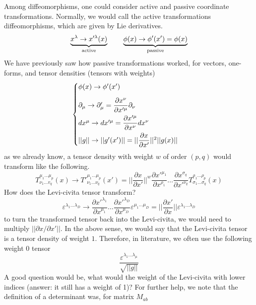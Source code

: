 \begin{recall}
Among diffeomorphisms, one could consider active and passive coordinate transformations. Normally, we would call the active transformations diffeomorphisms, which are given by Lie derivatives. 
\[\underbrace{x^{\lambda }\rightarrow x'^{\lambda }(x)}_{\mathrm{active}}\hspace{5ex}\underbrace{\phi(x)\rightarrow \phi '(x')=\phi (x) }_{\mathrm{passive}}\]
We have previously saw how passive transformations worked, for vectors, one-forms, and tensor densities (tensors with weights)
\[\begin{cases}
\vspace{2ex}\phi (x)\rightarrow \phi '(x')\\\vspace{1ex}
\partial _{\mu }\rightarrow \partial _{\mu }'=\dfrac{\partial x^{\nu }}{\partial x'^{\mu }}\partial _{\nu }\\\vspace{1ex}
dx^{\mu }\rightarrow dx'^{\mu }=\dfrac{\partial x'^{\mu }}{\partial x^{\nu }}dx^{\nu } \\||g||\rightarrow ||g'(x')||=||\dfrac{\partial x}{\partial x'}||^2||g(x)|| 
\end{cases}\]
as we already know, a tensor density with weight $w$ of order $(p,q)$ would transform like the following.
\[T^{\mu_1 \ldots \mu _{p} }_{\nu_1\ldots v_{q}}(x)\rightarrow T'^{\mu _1\ldots \mu _{p}}_{\nu _1\ldots \nu _{q}}(x')=||\dfrac{\partial x}{\partial x'}||^{w}\dfrac{\partial x'^{\mu_1}}{\partial x^{\rho_1}}\ldots \dfrac{\partial x^{\sigma _{q}}}{\partial x'^{\nu _{q}}}T^{\rho_1\ldots \rho _{p}}_{\sigma_1\ldots \sigma_{q} }(x)   \]
How does the Levi-civita tensor transform?
\[\varepsilon ^{\lambda_1\ldots \lambda _{D}}\rightarrow \dfrac{\partial x'^{\lambda_1 }}{\partial x^{\mu_1}}\ldots \dfrac{\partial x'^{\lambda_{D}}}{\partial x^{\mu _{D}}}\varepsilon ^{\mu_1\ldots \mu_{D}}=||\dfrac{\partial x'}{\partial x}||\varepsilon ^{\lambda_1\ldots \lambda _{D}}   \]
to turn the transformed tensor back into the Levi-civita, we would need to multiply $||\partial x/\partial x'||$. In the above sense, we would say that the Levi-civita tensor is a tensor density of weight $1$. Therefore, in literature, we often use the following weight $0$ tensor
\[\dfrac{\varepsilon ^{\lambda_1\ldots \lambda _{\mu }}}{\sqrt{||g||}}\]
A good question would be, what would the weight of the Levi-civita with lower indices (answer: it still has a weight of 1)? For further help, we note that the definition of a determinant was, for matrix $M_{ab}$

\end{recall}
